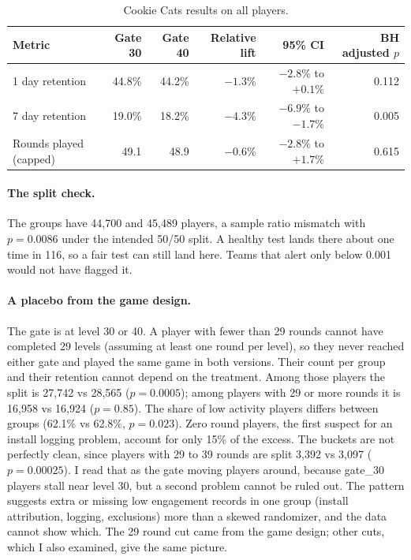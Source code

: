 \documentclass[10pt]{article}
\begin{document}
\begin{table}[H]
\centering\small
\begin{tabular}{lrrrrr}
\toprule
Metric & Gate 30 & Gate 40 & Relative lift & 95\% CI & BH adjusted $p$ \\
\midrule
1 day retention & 44.8\% & 44.2\% & $-1.3\%$ & $-2.8\%$ to $+0.1\%$ & 0.112 \\
7 day retention & 19.0\% & 18.2\% & $-4.3\%$ & $-6.9\%$ to $-1.7\%$ & 0.005 \\
Rounds played (capped) & 49.1 & 48.9 & $-0.6\%$ & $-2.8\%$ to $+1.7\%$ & 0.615 \\
\bottomrule
\end{tabular}
\caption{Cookie Cats results on all players.}
\end{table}

\paragraph{The split check.} The groups have 44,700 and 45,489 players, a sample ratio mismatch with $p = 0.0086$ under the intended 50/50 split. A healthy test lands there about one time in 116, so a fair test can still land here. Teams that alert only below 0.001 would not have flagged it.

\paragraph{A placebo from the game design.} The gate is at level 30 or 40. A player with fewer than 29 rounds cannot have completed 29 levels (assuming at least one round per level), so they never reached either gate and played the same game in both versions. Their count per group and their retention cannot depend on the treatment. Among those players the split is 27,742 vs 28,565 ($p = 0.0005$); among players with 29 or more rounds it is 16,958 vs 16,924 ($p = 0.85$). The share of low activity players differs between groups (62.1\% vs 62.8\%, $p = 0.023$). Zero round players, the first suspect for an install logging problem, account for only 15\% of the excess. The buckets are not perfectly clean, since players with 29 to 39 rounds are split 3,392 vs 3,097 ($p = 0.00025$). I read that as the gate moving players around, because gate\_30 players stall near level 30, but a second problem cannot be ruled out. The pattern suggests extra or missing low engagement records in one group (install attribution, logging, exclusions) more than a skewed randomizer, and the data cannot show which. The 29 round cut came from the game design; other cuts, which I also examined, give the same picture.
\end{document}
